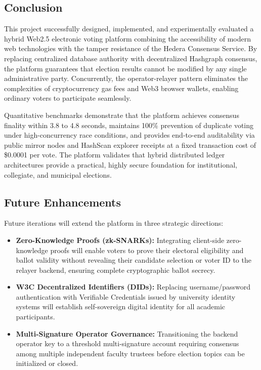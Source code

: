 \documentclass[12pt, a4paper]{article}
\begin{document}
\subsection{Conclusion}
This project successfully designed, implemented, and experimentally evaluated a hybrid Web2.5 electronic voting platform combining the accessibility of modern web technologies with the tamper resistance of the Hedera Consensus Service. By replacing centralized database authority with decentralized Hashgraph consensus, the platform guarantees that election results cannot be modified by any single administrative party. Concurrently, the operator-relayer pattern eliminates the complexities of cryptocurrency gas fees and Web3 browser wallets, enabling ordinary voters to participate seamlessly.

Quantitative benchmarks demonstrate that the platform achieves consensus finality within 3.8 to 4.8 seconds, maintains 100\% prevention of duplicate voting under high-concurrency race conditions, and provides end-to-end auditability via public mirror nodes and HashScan explorer receipts at a fixed transaction cost of \$0.0001 per vote. The platform validates that hybrid distributed ledger architectures provide a practical, highly secure foundation for institutional, collegiate, and municipal elections.

\subsection{Future Enhancements}
Future iterations will extend the platform in three strategic directions:
\begin{itemize}[leftmargin=*]
    \item \textbf{Zero-Knowledge Proofs (zk-SNARKs):} Integrating client-side zero-knowledge proofs will enable voters to prove their electoral eligibility and ballot validity without revealing their candidate selection or voter ID to the relayer backend, ensuring complete cryptographic ballot secrecy.
    \item \textbf{W3C Decentralized Identifiers (DIDs):} Replacing username/password authentication with Verifiable Credentials issued by university identity systems will establish self-sovereign digital identity for all academic participants.
    \item \textbf{Multi-Signature Operator Governance:} Transitioning the backend operator key to a threshold multi-signature account requiring consensus among multiple independent faculty trustees before election topics can be initialized or closed.
\end{itemize}
\end{document}
